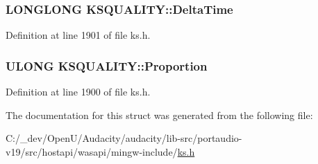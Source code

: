 \subsubsection[{\texorpdfstring{Delta\+Time}{DeltaTime}}]{\setlength{\rightskip}{0pt plus 5cm}L\+O\+N\+G\+L\+O\+NG K\+S\+Q\+U\+A\+L\+I\+T\+Y\+::\+Delta\+Time}\hypertarget{struct_k_s_q_u_a_l_i_t_y_a5312a7a9566d31f658196afcbe90ae14}{}\label{struct_k_s_q_u_a_l_i_t_y_a5312a7a9566d31f658196afcbe90ae14}


Definition at line 1901 of file ks.\+h.

\subsubsection[{\texorpdfstring{Proportion}{Proportion}}]{\setlength{\rightskip}{0pt plus 5cm}U\+L\+O\+NG K\+S\+Q\+U\+A\+L\+I\+T\+Y\+::\+Proportion}\hypertarget{struct_k_s_q_u_a_l_i_t_y_a93fadff43ac8b64a5d19c6eb8f347b85}{}\label{struct_k_s_q_u_a_l_i_t_y_a93fadff43ac8b64a5d19c6eb8f347b85}


Definition at line 1900 of file ks.\+h.



The documentation for this struct was generated from the following file\+:\begin{DoxyCompactItemize}
\item 
C\+:/\+\_\+dev/\+Open\+U/\+Audacity/audacity/lib-\/src/portaudio-\/v19/src/hostapi/wasapi/mingw-\/include/\hyperlink{ks_8h}{ks.\+h}\end{DoxyCompactItemize}
